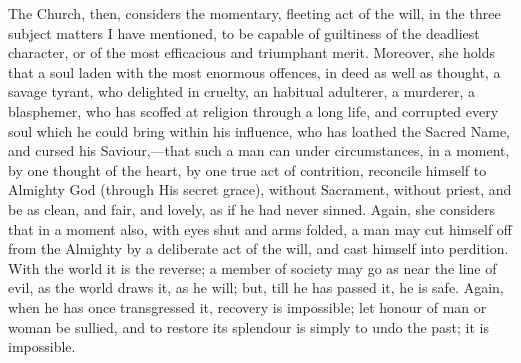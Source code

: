The Church, then, considers the momentary, fleeting act of the
will, in the three subject matters I have mentioned, to be capable of
guiltiness of the deadliest character, or of the most efficacious and
triumphant merit. Moreover, she holds that a soul laden with the most
enormous offences, in deed as well as thought, a savage tyrant, who
delighted in cruelty, an habitual adulterer, a murderer, a blasphemer,
who has scoffed at religion through a long life, and corrupted every
soul which he could bring within his influence, who has loathed the
Sacred Name, and cursed his Saviour,—that such a man can under
circumstances, in a moment, by one thought of the heart, by one true
act of contrition, reconcile himself to Almighty God (through His
secret grace), without Sacrament, without priest, and be as clean, and
fair, and lovely, as if he had never sinned. Again, she considers that
in a moment also, with eyes shut and arms folded, a man may cut
himself off from the Almighty by a deliberate act of the will, and
cast himself into perdition. With the world it is the reverse; a
member of society may go as near the line of evil, as the world draws
it, as he will; but, till he has passed it, he is safe. Again, when he
has once transgressed it, recovery is impossible; let honour of man or
woman be sullied, and to restore its splendour is simply to undo the
past; it is impossible.

